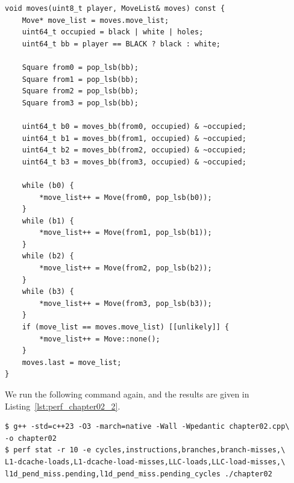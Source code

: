 \documentclass[12pt,a4paper,twoside,openright]{book}
\begin{document}
\begin{mdframed}[skipabove=\baselineskip,topline=false,rightline=false,bottomline=false,leftline=false,linewidth=1pt,linecolor=gray!40,innerleftmargin=8pt]
\begin{verbatim}
void moves(uint8_t player, MoveList& moves) const {
    Move* move_list = moves.move_list;
    uint64_t occupied = black | white | holes;
    uint64_t bb = player == BLACK ? black : white;

    Square from0 = pop_lsb(bb);
    Square from1 = pop_lsb(bb);
    Square from2 = pop_lsb(bb);
    Square from3 = pop_lsb(bb);
    
    uint64_t b0 = moves_bb(from0, occupied) & ~occupied;
    uint64_t b1 = moves_bb(from1, occupied) & ~occupied;
    uint64_t b2 = moves_bb(from2, occupied) & ~occupied;
    uint64_t b3 = moves_bb(from3, occupied) & ~occupied;
    
    while (b0) {
        *move_list++ = Move(from0, pop_lsb(b0));
    }
    while (b1) {
        *move_list++ = Move(from1, pop_lsb(b1));
    }
    while (b2) {
        *move_list++ = Move(from2, pop_lsb(b2));
    }
    while (b3) {
        *move_list++ = Move(from3, pop_lsb(b3));
    }
    if (move_list == moves.move_list) [[unlikely]] {
        *move_list++ = Move::none();
    }
    moves.last = move_list;
}
\end{verbatim}
\label{lst:random_games_perf3}
\end{mdframed}


We run the following command again, and the results are given in Listing~\ref{lst:perf_chapter02_2}.

\begin{mdframed}[skipabove=\baselineskip,skipbelow=0pt,hidealllines=true,backgroundcolor=black!3,innerleftmargin=10pt,innerrightmargin=5pt,innertopmargin=0pt,innerbottommargin=5pt]
{\small
\begin{verbatim}
$ g++ -std=c++23 -O3 -march=native -Wall -Wpedantic chapter02.cpp\
-o chapter02
$ perf stat -r 10 -e cycles,instructions,branches,branch-misses,\
L1-dcache-loads,L1-dcache-load-misses,LLC-loads,LLC-load-misses,\
l1d_pend_miss.pending,l1d_pend_miss.pending_cycles ./chapter02
\end{verbatim}
}
\end{mdframed}
\end{document}
